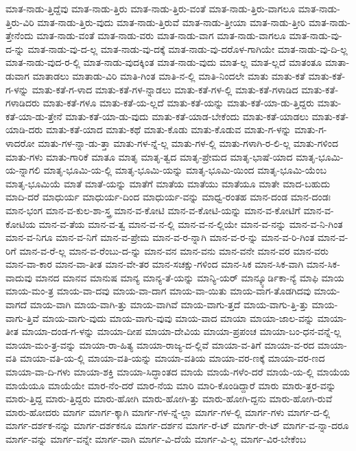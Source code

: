 {ಮಾತ-ನಾಡು-ತ್ತಿದ್ದೆವು
ಮಾತ-ನಾಡು-ತ್ತಿರು
ಮಾತ-ನಾಡು-ತ್ತಿರು-ವಂತೆ
ಮಾತ-ನಾಡು-ತ್ತಿರು-ವಾಗಲೂ
ಮಾತ-ನಾಡು-ತ್ತಿರು-ವಿರಿ
ಮಾತ-ನಾಡು-ತ್ತಿರು-ವುದು
ಮಾತ-ನಾಡು-ತ್ತಿರುವೆ
ಮಾತ-ನಾಡು-ತ್ತೀಯಾ
ಮಾತ-ನಾಡು-ತ್ತೀರಿ
ಮಾತ-ನಾಡು-ತ್ತೇನೆಂದು
ಮಾತ-ನಾಡು-ವಂತೆ
ಮಾತ-ನಾಡು-ವರು
ಮಾತ-ನಾಡು-ವಾಗ
ಮಾತ-ನಾಡು-ವಾಗಲೂ
ಮಾತ-ನಾಡು-ವು-ದ-ನ್ನು
ಮಾತ-ನಾಡು-ವು-ದ-ಲ್ಲ
ಮಾತ-ನಾಡು-ವು-ದಕ್ಕೆ
ಮಾತ-ನಾಡು-ವು-ದರೊಳ-ಗಾಗಿಯೇ
ಮಾತ-ನಾಡು-ವು-ದಿ-ಲ್ಲ
ಮಾತ-ನಾಡು-ವುದ-ರ-ಲ್ಲಿ
ಮಾತ-ನಾಡು-ವುದಕ್ಕಿಂತ
ಮಾತ-ನಾಡು-ವುದು
ಮಾತ-ಲ್ಲ
ಮಾತ-ಲ್ಲದೆ
ಮಾತಂತೂ
ಮಾತಾ-ಡುವಾಗ
ಮಾತಾಡಲು
ಮಾತಾಡು-ವಿರಿ
ಮಾತಿ-ಗಿಂತ
ಮಾತಿ-ನ-ಲ್ಲಿ
ಮಾತಿ-ನಿಂದಲೇ
ಮಾತು
ಮಾತು-ಕತೆ
ಮಾತು-ಕತೆ-ಗ-ಳನ್ನು
ಮಾತು-ಕತೆ-ಗ-ಳಾದ
ಮಾತು-ಕತೆ-ಗಳ-ನ್ನಾಡಲು
ಮಾತು-ಕತೆ-ಗಳ-ಲ್ಲಿ
ಮಾತು-ಕತೆ-ಗಳಾಡಿದ
ಮಾತು-ಕತೆ-ಗಳಾಡಿದರು
ಮಾತು-ಕತೆ-ಗಳೂ
ಮಾತು-ಕತೆ-ಯ-ಲ್ಲದೆ
ಮಾತು-ಕತೆ-ಯನ್ನು
ಮಾತು-ಕತೆ-ಯಾ-ಡು-ತ್ತಿದ್ದರು
ಮಾತು-ಕತೆ-ಯಾ-ಡು-ತ್ತೇನೆ
ಮಾತು-ಕತೆ-ಯಾ-ಡು-ವುದು
ಮಾತು-ಕತೆ-ಯಾಡ-ಬೇಕೆಂದು
ಮಾತು-ಕತೆ-ಯಾಡಲು
ಮಾತು-ಕತೆ-ಯಾಡಿ-ದರು
ಮಾತು-ಕತೆ-ಯಾದ
ಮಾತು-ಕಥೆ
ಮಾತು-ಕೊಡು
ಮಾತು-ಕೊಡುವ
ಮಾತು-ಗ-ಳನ್ನು
ಮಾತು-ಗ-ಳಾದರೋ
ಮಾತು-ಗಳ-ನ್ನಾ-ಡು-ತ್ತಾ
ಮಾತು-ಗಳ-ನ್ನೆ-ಲ್ಲ
ಮಾತು-ಗಳ-ಲ್ಲಿ
ಮಾತು-ಗಳಾಗಿ-ರ-ಲಿ-ಲ್ಲ
ಮಾತು-ಗಳಿಂದ
ಮಾತು-ಗಳು
ಮಾತು-ಗಾರಿಕೆ
ಮಾತೂ
ಮಾತೃ
ಮಾತೃ-ತ್ವದ
ಮಾತೃ-ಪ್ರೇಮದ
ಮಾತೃ-ಭಾಷೆ-ಯಾದ
ಮಾತೃ-ಭೂಮಿ-ಯ-ನ್ನಾಗಲಿ
ಮಾತೃ-ಭೂಮಿ-ಯ-ಲ್ಲಿ
ಮಾತೃ-ಭೂಮಿ-ಯನ್ನು
ಮಾತೃ-ಭೂಮಿ-ಯಿಂದ
ಮಾತೃ-ಭೂಮಿ-ಯೆಂಬ
ಮಾತೃ-ಭೂಮಿಯೆ
ಮಾತೆ
ಮಾತೆ-ಯನ್ನು
ಮಾತೆಗೆ
ಮಾತೆಯ
ಮಾತೆಯು
ಮಾತೆಯೂ
ಮಾತೇ
ಮಾದ-ಬಹುದು
ಮಾದಿ-ದರೆ
ಮಾಧುರ್ಯ
ಮಾಧುರ್ಯ-ದಿಂದ
ಮಾಧುರ್ಯ-ವನ್ನು
ಮಾಧ್ವ-ರಂತಹ
ಮಾನ-ದಂಡ
ಮಾನ-ದಂಡಃ
ಮಾನ-ಭಂಗ
ಮಾನ-ವ-ಕುಲ-ಶಾ-ಸ್ತ್ರ
ಮಾನ-ವ-ಕೋಟಿ
ಮಾನ-ವ-ಕೋಟಿ-ಯನ್ನು
ಮಾನ-ವ-ಕೋಟಿಗೆ
ಮಾನ-ವ-ಕೋಟಿಯ
ಮಾನ-ವ-ತೆಯ
ಮಾನ-ವ-ತ್ವ
ಮಾನ-ವ-ನ-ಲ್ಲಿ
ಮಾನ-ವ-ನ-ಲ್ಲಿಯೇ
ಮಾನ-ವ-ನನ್ನು
ಮಾನ-ವ-ನಿ-ಗಿಂತ
ಮಾನ-ವ-ನಿಗೂ
ಮಾನ-ವ-ನಿಗೆ
ಮಾನ-ವ-ಪ್ರೇಮ
ಮಾನ-ವ-ರ-ನ್ನಾಗಿ
ಮಾನ-ವ-ರ-ನ್ನು
ಮಾನ-ವ-ರಿ-ಗಿಂತ
ಮಾನ-ವ-ರಿಗೆ
ಮಾನ-ವ-ರೆ-ಲ್ಲ
ಮಾನ-ವ-ರೆಂಬು-ದ-ನ್ನು
ಮಾನ-ವನ
ಮಾನ-ವನು
ಮಾನ-ವನೇ
ಮಾನ-ವರ
ಮಾನ-ವರು
ಮಾನ-ವಾ-ಕಾರ
ಮಾನ-ವಾ-ತೀತ
ಮಾನ-ವೇ-ತರ
ಮಾನ-ಸಚಕ್ಷು-ಗಳಿಂದ
ಮಾನ-ಸಿಕ
ಮಾನ-ಸಿಕ-ವಾಗಿ
ಮಾನ-ಸಿಕ-ವಾದುವು
ಮಾನದ
ಮಾನವ
ಮಾನುಷ
ಮಾನ್ಯ
ಮಾನ್ಯ-ತೆ-ಯನ್ನು
ಮಾನ್ಯಿ-ಯರ್
ಮಾನ್ಕ್ಯೂರ್ಡಿಕಾ-ನ್ಯೆ
ಮಾಫಿ
ಮಾಯ
ಮಾಯ-ಮಂ-ತ್ರ
ಮಾಯ-ವಾ-ದವು
ಮಾಯ-ವಾ-ದಾಗ
ಮಾಯ-ವಾ-ಯಿತು
ಮಾಯ-ವಾಗ-ತೊಡಗಿದವು
ಮಾಯ-ವಾಗದೆ
ಮಾಯ-ವಾಗಿ
ಮಾಯ-ವಾಗಿ-ತ್ತು
ಮಾಯ-ವಾಗಿವೆ
ಮಾಯ-ವಾಗು-ತ್ತದೆ
ಮಾಯ-ವಾಗು-ತ್ತಿ-ತ್ತು
ಮಾಯ-ವಾಗು-ತ್ತಿವೆ
ಮಾಯ-ವಾಗು-ವುದು
ಮಾಯ-ವಾಗು-ವುವು
ಮಾಯ-ವಾದ
ಮಾಯಾ
ಮಾಯಾ-ಜಾಲ-ವನ್ನು
ಮಾಯಾ-ತೀತ
ಮಾಯಾ-ದಂಡ-ಗ-ಳನ್ನು
ಮಾಯಾ-ದೀಪ
ಮಾಯಾ-ದೇವಿಯ
ಮಾಯಾ-ಪ್ರಪಂಚ
ಮಾಯಾ-ಬಂ-ಧನ-ವನ್ನೆ-ಲ್ಲ
ಮಾಯಾ-ಮಂ-ತ್ರ-ವನ್ನು
ಮಾಯಾ-ರಾ-ಹಿತ್ಯ
ಮಾಯಾ-ರಾಜ್ಯ-ದ-ಲ್ಲಿವೆ
ಮಾಯಾ-ವ-ತಿಗೆ
ಮಾಯಾ-ವ-ರದ
ಮಾಯಾ-ವತಿ
ಮಾಯಾ-ವತಿ-ಯ-ಲ್ಲಿ
ಮಾಯಾ-ವತಿ-ಯನ್ನು
ಮಾಯಾ-ವತಿಯ
ಮಾಯಾ-ವರ-ಣಕ್ಕೆ
ಮಾಯಾ-ವರ-ಣದ
ಮಾಯಾ-ವಾ-ದಿ-ಗಳು
ಮಾಯಾ-ಶಕ್ತಿ
ಮಾಯಾ-ಸಿದ್ಧಾಂತದ
ಮಾಯೆ
ಮಾಯೆ-ಗಳೆಂ-ದರೆ
ಮಾಯೆ-ಯ-ಲ್ಲಿ
ಮಾಯೆಯ
ಮಾಯೆಯೂ
ಮಾಯೆಯೇ
ಮಾರ-ನೆಂ-ದರೆ
ಮಾರ-ನೆಯ
ಮಾರಿ
ಮಾರಿ-ಕೊಂಡಿದ್ದಾರೆ
ಮಾರು
ಮಾರು-ತ್ತರ-ವನ್ನು
ಮಾರು-ತ್ತಿದ್ದ
ಮಾರು-ತ್ತಿದ್ದರು
ಮಾರು-ಹೋಗಿ
ಮಾರು-ಹೋಗಿ-ತ್ತು
ಮಾರು-ಹೋಗಿ-ದ್ದನು
ಮಾರು-ಹೋಗಿ-ರುವೆ
ಮಾರು-ಹೋದರು
ಮಾರ್ಗ
ಮಾರ್ಗ-ಕ್ಕಾಗಿ
ಮಾರ್ಗ-ಗಳ-ನ್ನೆ-ಲ್ಲಾ
ಮಾರ್ಗ-ಗಳ-ಲ್ಲಿ
ಮಾರ್ಗ-ಗಳು
ಮಾರ್ಗ-ದ-ಲ್ಲಿ
ಮಾರ್ಗ-ದರ್ಶಕ-ನನ್ನು
ಮಾರ್ಗ-ದರ್ಶಕನೂ
ಮಾರ್ಗ-ದರ್ಶನ
ಮಾರ್ಗ-ರೆ-ಟ್
ಮಾರ್ಗ-ರೇ-ಟ್
ಮಾರ್ಗ-ವ-ನ್ನಾ-ದರೂ
ಮಾರ್ಗ-ವನ್ನು
ಮಾರ್ಗ-ವನ್ನೇ
ಮಾರ್ಗ-ವಾಗಿ
ಮಾರ್ಗ-ವಿ-ದೆಯೆ
ಮಾರ್ಗ-ವಿ-ಲ್ಲ
ಮಾರ್ಗ-ವಿರ-ಬೇಕೆಂಬ
}
